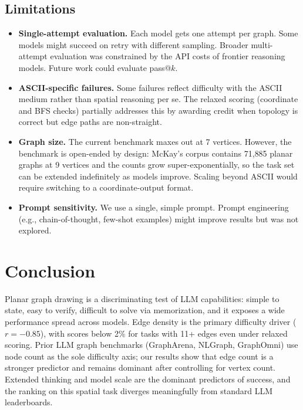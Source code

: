 \documentclass{article}
\begin{document}
\subsection{Limitations}

\begin{itemize}[nosep]
\item \textbf{Single-attempt evaluation.} Each model gets one attempt per graph. Some models might succeed on retry with different sampling. Broader multi-attempt evaluation was constrained by the API costs of frontier reasoning models. Future work could evaluate pass@$k$.
\item \textbf{ASCII-specific failures.} Some failures reflect difficulty with the ASCII medium rather than spatial reasoning per se. The relaxed scoring (coordinate and BFS checks) partially addresses this by awarding credit when topology is correct but edge paths are non-straight.
\item \textbf{Graph size.} The current benchmark maxes out at 7 vertices. However, the benchmark is open-ended by design: McKay's corpus contains 71{,}885 planar graphs at 9 vertices and the counts grow super-exponentially, so the task set can be extended indefinitely as models improve. Scaling beyond ASCII would require switching to a coordinate-output format.
\item \textbf{Prompt sensitivity.} We use a single, simple prompt. Prompt engineering (e.g., chain-of-thought, few-shot examples) might improve results but was not explored.
\end{itemize}

\section{Conclusion}

Planar graph drawing is a discriminating test of LLM capabilities: simple to state, easy to verify, difficult to solve via memorization, and it exposes a wide performance spread across models. Edge density is the primary difficulty driver ($r = -0.85$), with scores below 2\% for tasks with 11+ edges even under relaxed scoring. Prior LLM graph benchmarks (GraphArena, NLGraph, GraphOmni) use node count as the sole difficulty axis; our results show that edge count is a stronger predictor and remains dominant after controlling for vertex count. Extended thinking and model scale are the dominant predictors of success, and the ranking on this spatial task diverges meaningfully from standard LLM leaderboards.
\end{document}
